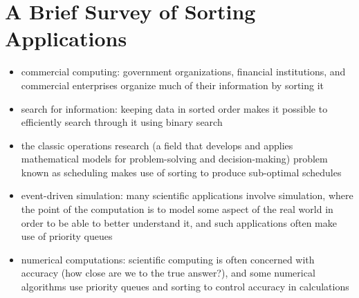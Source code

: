 \documentclass[8pt,a4paper,compress]{beamer}
\begin{document}
\section{A Brief Survey of Sorting Applications}
\begin{frame}[fragile]
\begin{itemize}
\item commercial computing: government organizations, financial institutions, and commercial enterprises organize much of their information by sorting it

\item search for information: keeping data in sorted order makes it possible to efficiently search through it using binary search

\item the classic operations research (a field that develops and applies mathematical models for problem-solving and decision-making) problem known as scheduling makes use of sorting to produce sub-optimal schedules

\item event-driven simulation: many scientific applications involve simulation, where the point of the computation is to model some aspect of the real world in order to be able to better understand it, and such applications often make use of priority queues

\item numerical computations: scientific computing is often concerned with accuracy (how close are we to the true answer?), and some numerical algorithms use priority queues and sorting to control accuracy in calculations
\end{itemize}
\end{frame}
\end{document}
